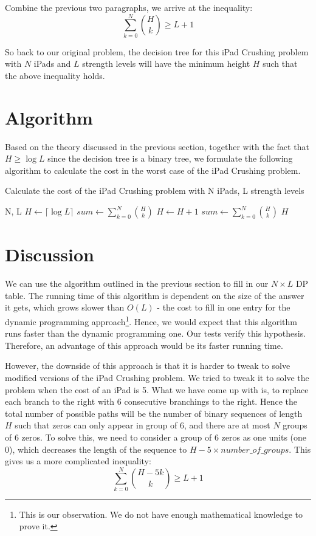 \documentclass[12pt,a4paper,oneside]{report}
\begin{document}
Combine the previous two paragraphs, we arrive at the inequality: \[\sum_{k=0}^{N} {H \choose k} \geq L+1\]

So back to our original problem, the decision tree for this iPad Crushing problem with $N$ iPads and $L$ strength levels will have the minimum height $H$ such that the above inequality holds.

\section{Algorithm}
Based on the theory discussed in the previous section, together with the fact that $H \geq \log L$ since the decision tree is a binary tree, we formulate the following algorithm to calculate the cost in the worst case of the iPad Crushing problem.

\begin{algorithm}
        \caption{Calculate the cost of the iPad Crushing problem with N iPads, L strength levels}
        \begin{algorithmic}[1]
            \REQUIRE N, L
	\STATE $H \leftarrow \lceil \log L\rceil$
	\STATE $sum \leftarrow \sum_{k=0}^{N} {H \choose k}$
		\STATE $H \leftarrow H+1$
		\STATE $sum \leftarrow \sum_{k=0}^{N} {H \choose k}$
	\ENDWHILE
	\RETURN $H$
        \end{algorithmic}
\end{algorithm}

\section{Discussion}
We can use the algorithm outlined in the previous section to fill in our $N \times L$ DP table. The running time of this algorithm is dependent on the size of the answer it gets, which grows slower than $O(L)$ - the cost to fill in one entry for the dynamic programming approach\footnote{This is our observation. We do not have enough mathematical knowledge to prove it.}. Hence, we would expect that this algorithm runs faster than the dynamic programming one. Our tests verify this hypothesis. Therefore, an advantage of this approach would be its faster running time.

However, the downside of this approach is that it is harder to tweak to solve modified versions of the iPad Crushing problem. We tried to tweak it to solve the problem when the cost of an iPad is 5. What we have come up with is, to replace each branch to the right with 6 consecutive branchings to the right. Hence the total number of possible paths will be the number of binary sequences of length $H$ such that zeros can only appear in group of 6, and there are at most $N$ groups of 6 zeros. To solve this, we need to consider a group of 6 zeros as one units (one 0), which decreases the length of the sequence to $H - 5 \times number\_of\_groups$. This gives us a more complicated inequality: \[\sum_{k=0}^{N} {H-5k \choose k} \geq L+1\]
\end{document}
